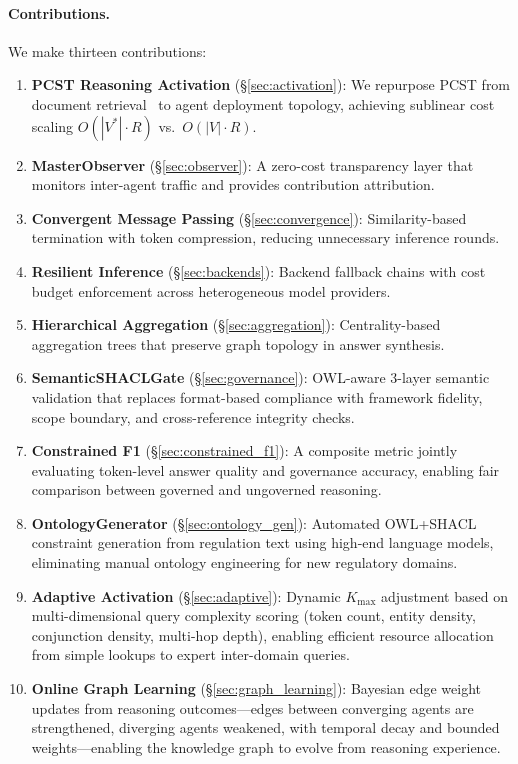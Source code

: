 \documentclass[a4paper,11pt]{article}
\theoremstyle{definition}
\begin{document}
\paragraph{Contributions.} We make thirteen contributions:

\begin{enumerate}
\item \textbf{PCST Reasoning Activation} (\S\ref{sec:activation}): We repurpose PCST from document retrieval~\cite{tamrplus2026} to agent deployment topology, achieving sublinear cost scaling $O(|V^*| \cdot R)$ vs.\ $O(|V| \cdot R)$.
\item \textbf{MasterObserver} (\S\ref{sec:observer}): A zero-cost transparency layer that monitors inter-agent traffic and provides contribution attribution.
\item \textbf{Convergent Message Passing} (\S\ref{sec:convergence}): Similarity-based termination with token compression, reducing unnecessary inference rounds.
\item \textbf{Resilient Inference} (\S\ref{sec:backends}): Backend fallback chains with cost budget enforcement across heterogeneous model providers.
\item \textbf{Hierarchical Aggregation} (\S\ref{sec:aggregation}): Centrality-based aggregation trees that preserve graph topology in answer synthesis.
\item \textbf{SemanticSHACLGate} (\S\ref{sec:governance}): OWL-aware 3-layer semantic validation that replaces format-based compliance with framework fidelity, scope boundary, and cross-reference integrity checks.
\item \textbf{Constrained F1} (\S\ref{sec:constrained_f1}): A composite metric jointly evaluating token-level answer quality and governance accuracy, enabling fair comparison between governed and ungoverned reasoning.
\item \textbf{OntologyGenerator} (\S\ref{sec:ontology_gen}): Automated OWL+SHACL constraint generation from regulation text using high-end language models, eliminating manual ontology engineering for new regulatory domains.
\item \textbf{Adaptive Activation} (\S\ref{sec:adaptive}): Dynamic $K_{\max}$ adjustment based on multi-dimensional query complexity scoring (token count, entity density, conjunction density, multi-hop depth), enabling efficient resource allocation from simple lookups to expert inter-domain queries.
\item \textbf{Online Graph Learning} (\S\ref{sec:graph_learning}): Bayesian edge weight updates from reasoning outcomes—edges between converging agents are strengthened, diverging agents weakened, with temporal decay and bounded weights—enabling the knowledge graph to evolve from reasoning experience.

\end{enumerate}
\end{document}

